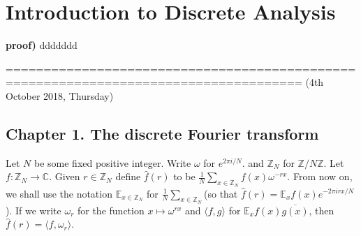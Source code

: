 \documentclass[10pt,a4paper]{report}
\renewcommand{\hat}{\widehat}
\newenvironment{proof}
{\begin{changemargin}{1cm}{0.5cm} 
	}%
	{\end{changemargin}
}
\begin{document}
\newcommand{\thm}{\textbf{Theorem)}}
\newcommand{\thmnum}[1]{\textbf{Theorem #1)}}
\newcommand{\defi}{\textbf{Definition)}}
\newcommand{\lem}{\textbf{Lemma)}}
\newcommand{\lemnum}[1]{\textbf{Lemma #1)}}
\newcommand{\prop}{\textbf{Proposition)}}
\newcommand{\pf}{\textbf{proof) }}
\newcommand{\eop}{\hfill  \textsl{(End of proof)} $\square$} %


\newcommand{\lap}{\triangle} %
\newcommand{\s}{\vspace{10pt}}
\newcommand{\bull}{$\bullet$}
\newcommand{\sta}{$\star$}
\newcommand{\reals}{\mathbb{R}}

\newcommand{\intN}{\mathbb{Z}_N}
\newcommand{\norms}[2]{\parallel #1 \parallel_{#2}}
\newcommand{\avg}{\mathbb{E}}
\newcommand{\prob}{\mathbb{P}}
\newcommand{\osc}{\text{\osc}}

\newcommand{\newday}{================================================================}

\renewcommand{\bar}{\overline}

\setlength\parindent{0pt}

\chapter*{Introduction to Discrete Analysis}
\s

\begin{proof}
\pf ddddddd
\end{proof}


=====================================================================================
(4th October 2018, Thursday)
\s

\section*{Chapter 1. The discrete Fourier transform}
\s

Let $N$ be some fixed positive integer. Write $\omega$ for $e^{2\pi i /N}$. and $\mathbb{Z}_N$ for $\mathbb{Z}/N\mathbb{Z}$. Let $f: \mathbb{Z}_N \rightarrow \mathbb{C}$. Given $r \in \mathbb{Z}_N$ define $\hat{f}(r)$ to be $\frac{1}{N} \sum_{x \in \mathbb{Z}_N} f(x) \omega^{-rx}$. From now on, we shall use the notation $\mathbb{E}_{x\in \mathbb{Z}_N}$ for $\frac{1}{N} \sum_{x \in \mathbb{Z}_N}$(so that $\hat{f}(r)  = \mathbb{E}_x f(x)e^{-2\pi i rx/N}$). If we write $\omega_r$ for the function $x\mapsto \omega^{rx}$ and $\langle f,g \rangle$ for $\mathbb{E}_x f(x)\bar{g(x)}$, then $\hat{f}(r) = \langle f,\omega_r \rangle$.
\s
\end{document}
